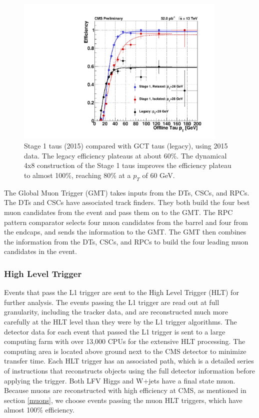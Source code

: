 \documentclass[oneside, letterpaper, oldfontcommands]{memoir}
\begin{document}
\begin{figure}[here]
\includegraphics[width=0.9\textwidth]{TDR_RlxIsoLegacy_28GeV.pdf}
\caption{Stage 1 taus (2015) compared with GCT taus (legacy), using 2015 data. The legacy efficiency plateaus at about 60\%. The dynamical 4x8 construction of the Stage 1 taus improves the efficiency plateau to almost 100\%, reaching 80\% at a $p_{T}$ of 60 GeV.}
\label{fig:2012to2015taus}
\end{figure}

\qquad The Global Muon Trigger (GMT) takes inputs from the DTs, CSCs, and RPCs. The DTs and CSCs have associated track finders. They both build the four best muon candidates from the event and pass them on to the GMT. The RPC pattern comparator selects four muon candidates from the barrel and four from the endcaps, and sends the information to the GMT. The GMT then combines the information from the DTs, CSCs, and RPCs to build the four leading muon candidates in the event. 

\subsubsection{High Level Trigger}
\qquad Events that pass the L1 trigger are sent to the High Level Trigger (HLT) for further analysis. The  events passing the L1 trigger are read out at full granularity, including the tracker data, and are reconstructed much more carefully at the HLT level than they were by the L1 trigger algorithms. The detector data for each event that passed the L1 trigger is sent to a large computing farm with over 13,000 CPUs for the extensive HLT processing. The computing area is located above ground next to the CMS detector to minimize transfer time. Each HLT trigger has an associated path, which is a detailed series of instructions that reconstructs objects using the full detector information before applying the trigger. Both LFV Higgs and W+jets have a final state muon. Because muons are reconstructed with high efficiency at CMS, as mentioned in section \ref{muons}, we choose events passing the muon HLT triggers, which have almost 100\% efficiency.
\end{document}
